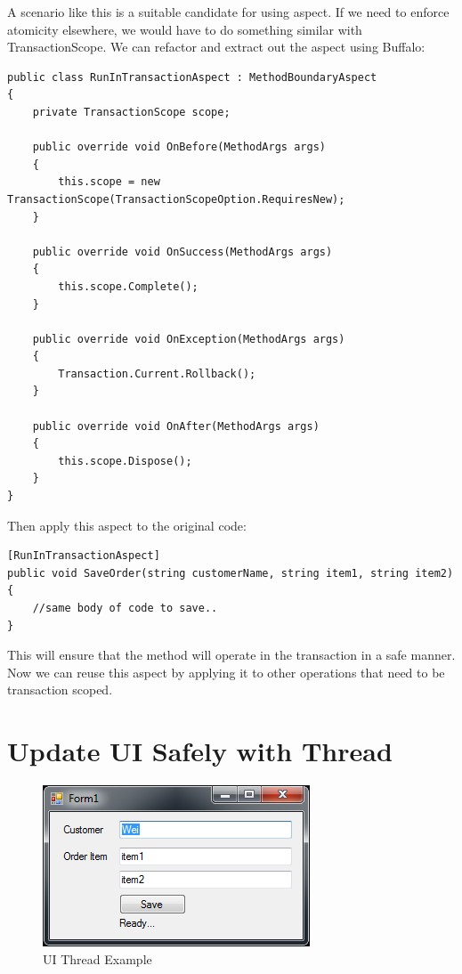 A scenario like this is a suitable candidate for using aspect. If we need to enforce atomicity elsewhere, we would have to do something similar with TransactionScope. We can refactor and extract out the aspect using Buffalo:

\begin{lstlisting}[caption={RunInTransactionAspect}, label=transaspect, frame=tb, basicstyle=\scriptsize]
public class RunInTransactionAspect : MethodBoundaryAspect
{
	private TransactionScope scope;

	public override void OnBefore(MethodArgs args)
	{
		this.scope = new TransactionScope(TransactionScopeOption.RequiresNew);
	}

	public override void OnSuccess(MethodArgs args)
	{
		this.scope.Complete();
	}

	public override void OnException(MethodArgs args)
	{
		Transaction.Current.Rollback();
	}

	public override void OnAfter(MethodArgs args)
	{
		this.scope.Dispose();
	}
}
\end{lstlisting}

Then apply this aspect to the original code:
\begin{lstlisting}[caption={SaveOrder With Aspect}, label=saveorderwithaspect, frame=tb, basicstyle=\scriptsize]
[RunInTransactionAspect]
public void SaveOrder(string customerName, string item1, string item2)
{
	//same body of code to save..
}
\end{lstlisting}

This will ensure that the method will operate in the transaction in a safe manner. Now we can reuse this aspect by applying it to other operations that need to be transaction scoped.

\section{Update UI Safely with Thread}

\begin{figure}[H]
  \includegraphics[scale=1.0]{Thread.PNG}
  \centering
  \caption{UI Thread Example\label{uithread}}
\end{figure}

